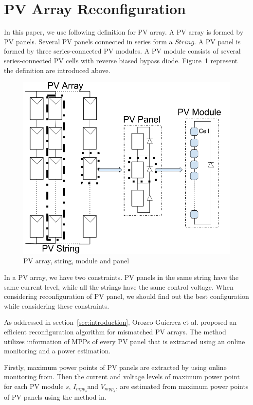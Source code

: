 \documentclass[journal]{IEEEtran}
\begin{document}
\section{PV Array Reconfiguration}\label{sec:pv-array-reconf}
In this paper, we use following definition for PV array.
A PV array is formed by PV panels.
Several PV panels connected in series form a $String$.
A PV panel is formed by three series-connected PV modules.
A PV module consists of several series-connected PV cells with reverse biased bypass diode.
Figure~\ref{fig:array} represent the definition are introduced above.
\begin{figure}[ht]
\centerline{\includegraphics[width=\linewidth]{fig/module.png}}
\caption[]{PV array, string, module and panel}
\label{fig:array}
\end{figure}
In a PV array, we have two constraints.
PV panels in the same string have the same current level, while all the strings have the same control voltage.
When considering reconfiguration of PV panel, we should find out the best configuration while considering these constraints.

As addressed in section~\ref{sec:introduction}, Orozco-Guierrez et al. proposed an efficient reconfiguration algorithm for mismatched PV arrays.
The method utilizes information of MPPs of every PV panel that is extracted using an online monitoring\cite{Carotenuto2014} and a power estimation\cite{Orozco-Gutierrez2015}.

Firstly, maximum power points of PV panels are extracted by using online monitoring from\cite{Carotenuto2014}.
Then the current and voltage levels of maximum power point for each PV module $s$, $I_{mpp_{s}}$and $V_{mpp_{s}}$, are estimated from maximum power points of PV panels using the method in\cite{Orozco-Gutierrez2015}.
\end{document}

